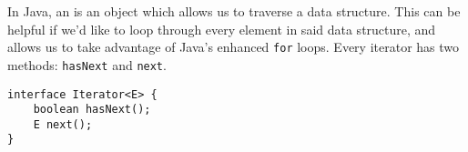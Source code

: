 In Java, an  is an object which allows us to traverse a data
structure. This can be helpful if we'd like to loop through every element in said data structure,
and allows us to take advantage of Java's enhanced \lstinline{for} loops. 
Every iterator has two methods: \lstinline$hasNext$ and \lstinline$next$.

\begin{lstlisting}
interface Iterator<E> {
    boolean hasNext();
    E next();
}
\end{lstlisting}
